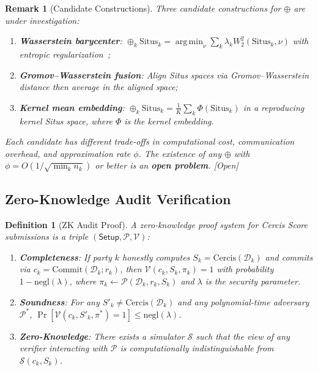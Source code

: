 \documentclass[12pt,a4paper]{article}
\newtheorem{definition}[theorem]{Definition}
\newtheorem{remark}[theorem]{Remark}
\newcommand{\openquest}{\textcolor{red!70!black}{\small\textsf{[Open]}}}
\newcommand{\cD}{\mathcal{D}}
\newcommand{\argmin}{\operatorname*{arg\,min}}
\newcommand{\Situs}{\mathrm{Situs}}
\newcommand{\Cercis}{\mathrm{Cercis}}
\newcommand{\Commit}{\mathrm{Commit}}
\begin{document}
\begin{remark}[Candidate Constructions]
Three candidate constructions for $\oplus$ are under investigation:
\begin{enumerate}[label=(\roman*)]
    \item \textbf{Wasserstein barycenter}: $\oplus_k \Situs_k =
          \argmin_{\nu} \sum_k \lambda_k W_2^2(\Situs_k, \nu)$ with
          entropic regularization~\citep{cuturi2013sinkhorn};
    \item \textbf{Gromov--Wasserstein fusion}: Align Situs spaces via
          Gromov--Wasserstein distance then average in the aligned space;
    \item \textbf{Kernel mean embedding}: $\oplus_k \Situs_k =
          \frac{1}{K}\sum_k \Phi(\Situs_k)$ in a reproducing kernel
          Situs space, where $\Phi$ is the kernel embedding.
\end{enumerate}
Each candidate has different trade-offs in computational cost, communication
overhead, and approximation rate $\phi$.  The existence of \emph{any}
$\oplus$ with $\phi = O(1/\sqrt{\min_k n_k})$ or better is an \textbf{open
problem}.  \openquest
\end{remark}

\subsection{Zero-Knowledge Audit Verification}

\begin{definition}[ZK Audit Proof]
\label{def:zk-proof}
A zero-knowledge proof system for Cercis Score submissions is a triple
$(\mathsf{Setup}, \mathcal{P}, \mathcal{V})$:
\begin{enumerate}[label=(\roman*)]
    \item \textbf{Completeness}: If party $k$ honestly computes
          $S_k = \Cercis(\cD_k)$ and commits via
          $c_k = \Commit(\cD_k; r_k)$, then
          $\mathcal{V}(c_k, S_k, \pi_k) = 1$ with probability
          $1 - \mathrm{negl}(\lambda)$, where
          $\pi_k \gets \mathcal{P}(\cD_k, r_k, S_k)$ and $\lambda$ is the
          security parameter.
    \item \textbf{Soundness}: For any $S'_k \neq \Cercis(\cD_k)$ and any
          polynomial-time adversary $\mathcal{P}^*$,
          $\Pr[\mathcal{V}(c_k, S'_k, \pi^*) = 1] \leq \mathrm{negl}(\lambda)$.
    \item \textbf{Zero-Knowledge}: There exists a simulator $\mathcal{S}$
          such that the view of any verifier interacting with $\mathcal{P}$
          is computationally indistinguishable from $\mathcal{S}(c_k, S_k)$.
\end{enumerate}
\end{definition}
\end{document}
